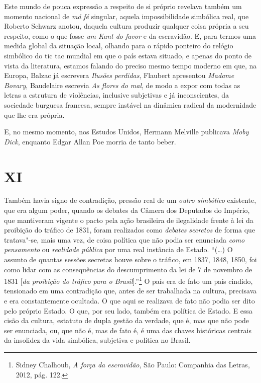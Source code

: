 Este mundo de pouca expressão a respeito de si próprio revelava também
um momento nacional de \emph{má} \emph{fé} singular, aquela
impossibilidade simbólica real, que Roberto Schwarz anotou, daquela
cultura produzir qualquer coisa própria a seu respeito, como o que fosse
\emph{um Kant do favor} e da escravidão. E, para termos uma medida
global da situação local, olhando para o rápido ponteiro do relógio
simbólico do tic tac mundial em que o país estava situado, e apenas do
ponto de vista da literatura, estamos falando do preciso mesmo tempo
moderno em que, na Europa, Balzac já escrevera \emph{Ilusões perdidas},
Flaubert apresentou \emph{Madame Bovary}, Baudelaire escrevia \emph{As
flores do mal}, de modo a expor com todas as letras a estrutura de
violências, inclusive subjetivas e já inconscientes, da sociedade
burguesa francesa, sempre instável na dinâmica radical da modernidade
que lhe era própria.

E, no mesmo momento, nos Estudos Unidos, Hermann Melville publicava
\emph{Moby Dick}, enquanto Edgar Allan Poe morria de tanto beber.

\section{XI}

Também havia signo de contradição, pressão real de um \emph{outro
simbólico} existente, que era algum poder, quando os debates da Câmera
dos Deputados do Império, que mantiveram vigente o pacto pela ação
brasileira de ilegalidade frente à lei da proibição do tráfico de 1831,
foram realizados como \emph{debates} \emph{secretos} de forma que
tratava"-se, mais uma vez, de coisa política que não podia ser enunciada
\emph{como pensamento} ou \emph{realidade pública} por uma real
instância de Estado. ``(\ldots{}) O assunto de quantas sessões secretas houve
sobre o tráfico, em 1837, 1848, 1850, foi como lidar com as
consequências do descumprimento da lei de 7 de novembro de 1831
{[}\emph{da proibição do tráfico para o Brasil}{]}.''\footnote{Sidney
  Chalhoub, \emph{A força da escravidão}, São Paulo: Companhia das
  Letras, 2012, pág. 122.} O país era de fato um país cindido,
tensionado em uma contradição que, antes de ser trabalhada na cultura,
precisava e era constantemente ocultada. O que aqui se realizava de fato
não podia ser dito pelo próprio Estado. O que, por seu lado, também era
política de Estado. E essa cisão da cultura, estatuto de dupla gestão da
verdade, que é, mas que não pode ser enunciada, ou, que não é, mas de
fato é, é uma das chaves históricas centrais da insolidez da vida
simbólica, subjetiva e política no Brasil.

